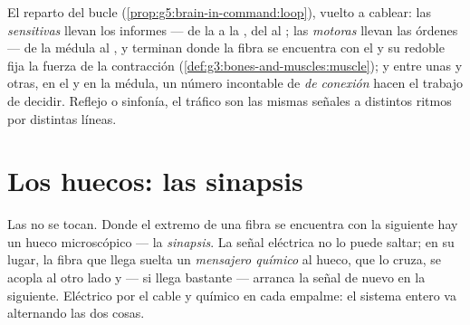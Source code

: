 \begin{example}\label{ex:g8:nervous-communication:lines}
El reparto del bucle (\cref{prop:g5:brain-in-command:loop}), vuelto a
cablear: las \emph{ sensitivas} llevan los informes --- de la
 a la , del  al ; las \emph{
motoras} llevan las órdenes --- de la médula al , y terminan
donde la fibra se encuentra con el  y su redoble fija la fuerza
de la contracción (\cref{def:g3:bones-and-muscles:muscle}); y entre
unas y otras, en el  y en la médula, un número incontable de
\emph{ de conexión} hacen el trabajo de decidir. Reflejo o
sinfonía, el tráfico son las mismas señales a distintos ritmos por
distintas líneas.
\end{example}

\section{Los huecos: las sinapsis}

\begin{definition}[La sinapsis]\label{def:g8:nervous-communication:synapse}
Las  no se tocan. Donde el extremo de una fibra se encuentra
con la  siguiente hay un hueco microscópico --- la
\emph{sinapsis}. La señal eléctrica no lo puede saltar;
en su lugar, la fibra que llega suelta un \emph{mensajero químico} al
hueco, que lo cruza, se acopla al otro lado y --- si llega bastante ---
arranca la señal de nuevo en la  siguiente. Eléctrico por el
cable y químico en cada empalme: el sistema entero va alternando las
dos cosas.
\end{definition}

